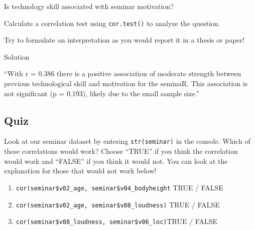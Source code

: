 \documentclass[
]{book}
\newenvironment{Shaded}{\begin{snugshade}}{\end{snugshade}}
\newcommand{\CommentTok}[1]{\textcolor[rgb]{0.56,0.35,0.01}{\textit{#1}}}
\newcommand{\FunctionTok}[1]{\textcolor[rgb]{0.13,0.29,0.53}{\textbf{#1}}}
\newcommand{\NormalTok}[1]{#1}
\newcommand{\SpecialCharTok}[1]{\textcolor[rgb]{0.81,0.36,0.00}{\textbf{#1}}}
\providecommand{\tightlist}{%
  \setlength{\itemsep}{0pt}\setlength{\parskip}{0pt}}
\begin{document}
Is technology skill associated with seminar motivation?

Calculate a correlation test using \texttt{cor.test()} to analyze the question.

Try to formulate an interpretation as you would report it in a thesis or paper!

Solution

\begin{Shaded}
\end{Shaded}

``With r = 0.386 there is a positive association of moderate strength between previous technological skill and motivation for the seminaR. This association is not significant (p = 0.193), likely due to the small sample size.''

\subsection{Quiz}\label{quiz}

Look at our seminar dataset by entering \texttt{str(seminar)} in the console.
Which of these correlations would work?
Choose ``TRUE'' if you think the correlation would work and ``FALSE'' if you think it would not.
You can look at the explanation for those that would not work below!

\begin{enumerate}
\def\labelenumi{\arabic{enumi}.}
\tightlist
\item
  \texttt{cor(seminar\$v02\_age,\ seminar\$v04\_bodyheight} TRUE / FALSE
\item
  \texttt{cor(seminar\$v02\_age,\ seminar\$v08\_loudness)} TRUE / FALSE
\item
  \texttt{cor(seminar\$v08\_loudness,\ seminar\$v06\_loc)}TRUE / FALSE
\end{enumerate}
\end{document}
